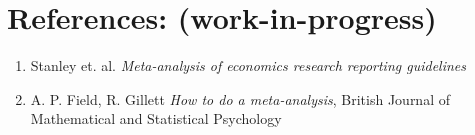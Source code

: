 \documentclass{article}
\begin{document}
\newpage

\section*{References: (work-in-progress)}

\begin{enumerate}
    \item Stanley et. al. \textit{Meta-analysis of economics research reporting guidelines}
    \item A. P. Field, R. Gillett \textit{How to do a meta-analysis}, British Journal of Mathematical and Statistical Psychology
\end{enumerate}
\end{document}
